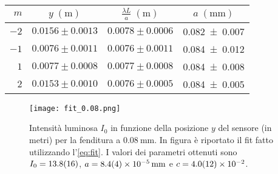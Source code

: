 \documentclass[../main.tex]{subfiles}
\begin{document}
\begin{table}[ht!]
    \centering
    \caption{}
    \begin{tabular}{r|cc|c}
        \toprule
        $m$  & $y \; (\si{\metre})$ & $\frac{\lambda L}{a} \; (\si{\metre})$ & $a \; (\si{\mm})$ \\
        \midrule
        $-2$ & $0.0156 \pm 0.0013$ & $0.0078 \pm 0.0006$ & \num{0.082+-0.007} \\
        $-1$ & $0.0076 \pm 0.0011$ & $0.0076 \pm 0.0011$ & \num{0.084+-0.012} \\
        $1$  & $0.0077 \pm 0.0008$ & $0.0077 \pm 0.0008$ & \num{0.084+-0.008} \\
        $2$  & $0.0153 \pm 0.0010$ & $0.0076 \pm 0.0005$ & \num{0.084+-0.005} \\
        \bottomrule
    \end{tabular}
    \label{tab:minimi 0.08}
\end{table}



\begin{figure}[ht!]
    \centering
    \texttt{[image: fit\_0.08.png]}
    \caption{Intensità luminosa $I_{0}$ in funzione della posizione $y$ del sensore (in metri) per la fenditura a $\qty{0.08}{\mm}$. In figura è riportato il fit fatto utilizzando l'\autoref{eq:fit}. I valori dei parametri ottenuti sono $I_{0} = \num{13.8+-1.6}$, $a = \qty{8.4+-0.4e-5}{\mm}$ e $c = \num{4+-1.2e-2}$. }
    \label{fig:fit 0.08}
\end{figure}

\end{document}

